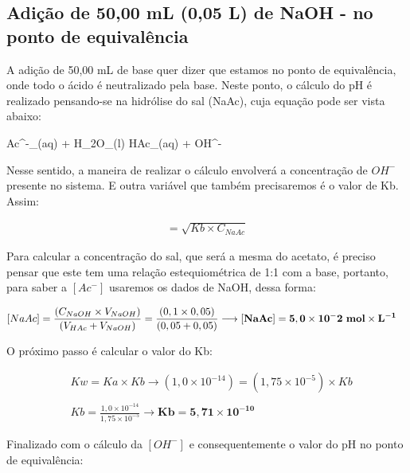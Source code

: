 \documentclass[a4paper, 12pt]{article}
\begin{document}
\subsection{Adição de 50,00 mL (0,05 L) de NaOH - no ponto de equivalência}
A adição de 50,00 mL de base quer dizer que estamos no ponto de equivalência, onde todo o ácido é neutralizado pela base. Neste ponto, o cálculo do pH é realizado pensando-se na hidrólise do sal (NaAc), cuja equação pode ser vista abaixo:

\begin{chemeqn}
	Ac^{-}_{(aq)} + H_{2}O_{(l)} \equilibarrow HAc_{(aq)} + OH^-{} 
\end{chemeqn}

Nesse sentido, a maneira de realizar o cálculo envolverá a concentração de $OH^{-}$ presente no sistema. E outra variável que também precisaremos é o valor de Kb. Assim:

\begin{fleqn}
	\begin{align*}
		[OH^{-}] = \sqrt{Kb \times C_{NaAc}}
	\end{align*}
\end{fleqn}

Para calcular a concentração do sal, que será a mesma do acetato, é preciso pensar que este tem uma relação estequiométrica de 1:1 com a base, portanto, para saber a $[Ac^{-}]$ usaremos os dados de NaOH, dessa forma:

\begin{fleqn}
	\begin{align*}
		&[NaAc] = \frac{ (C_{NaOH} \times V_{NaOH}) }{ (V_{HAc} + V_{NaOH}) } = \frac{ (0,1 \times 0,05) }{ (0,05 + 0,05) } \longrightarrow	 \mathbf{[NaAc] = 5,0 \times 10^-2 \text{ \textbf{mol}} \times L^{-1}}
	\end{align*}
\end{fleqn}

O próximo passo é calcular o valor do Kb: 

\begin{fleqn}
	\begin{align*}
		&Kw = Ka \times Kb \longrightarrow	 (1,0 \times 10^{-14}) = (1,75 \times 10^{-5}) \times Kb \\ \\
		&Kb = \frac{1,0 \times 10^{-14}}{1,75 \times 10^{-5}} \longrightarrow	 \mathbf{Kb = 5,71 \times 10^{-10}}
	\end{align*}
\end{fleqn}

Finalizado com o cálculo da $[OH^{-}]$ e consequentemente o valor do pH no ponto de equivalência:
\end{document}
